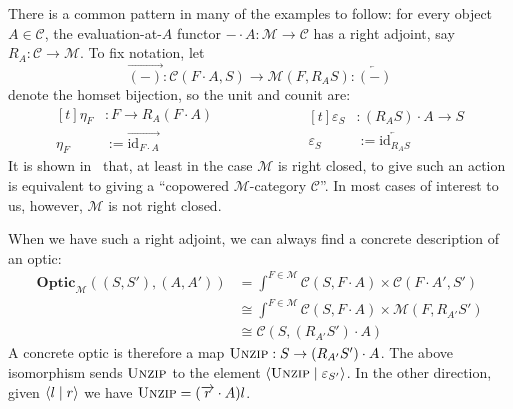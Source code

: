 \documentclass[11pt,letterpaper]{article}
\theoremstyle{plain}
\theoremstyle{definition}
\newcommand{\C}{\mathscr{C}}
\newcommand{\M}{\mathscr{M}}
\newcommand{\Optic}{\mathbf{Optic}}
\newcommand{\id}{\mathrm{id}}
\newcommand{\act}{\cdot}
\newcommand{\rep}[2]{{\ensuremath \left\langle #1 \mid #2 \right\rangle}}
\newcommand{\funzip}{\textsc{Unzip}}
\newcommand{\todo}[1]{\textcolor{red}{\small #1}}
\begin{document}
There is a common pattern in many of the examples to follow: for every object $A \in \C$, the evaluation-at-$A$ functor $- \act A : \M \to \C$ has a right adjoint, say $R_A : \C \to \M$. To fix notation, let \[\overrightarrow{(-)} : \C(F \act A, S) \to \M(F, R_{A} S) : \overleftarrow{(-)}\] denote the homset bijection, so the unit and counit are:
    \begin{equation*}
    \begin{aligned}[t]
  	\eta_F &: F \to R_A (F \act A) \\
    \eta_F &:= \overrightarrow{\id_{F \act A}}
    \end{aligned}
    \qquad\qquad\qquad
    \begin{aligned}[t]
    \varepsilon_{S} &: (R_A S) \cdot A \to S \\
    \varepsilon_{S} &:= \overleftarrow{\id_{R_{A} S}}
    \end{aligned}
\end{equation*}
It is shown in~\cite[Section 6]{ANoteOnActions} that, at least in the case $\M$ is right closed, to give such an action is equivalent to giving a ``copowered $\M$-category $\C$''. In most cases of interest to us, however, $\M$ is not right closed. %

When we have such a right adjoint, we can always find a concrete description of an optic:
\begin{align*}
\Optic_\M((S, S'), (A, A')) &= \int^{F \in \M} \C(S, F\act A) \times \C(F\act A', S') \\
&\cong \int^{F \in \M} \C(S, F \act A) \times \M(F, R_{A'} S') \\
&\cong \C(S,  (R_{A'} S') \act A)
\end{align*}
A concrete optic is therefore a map $\funzip : S \to (R_{A'} S') \act A$. The above isomorphism sends $\funzip$ to the element $\rep{\funzip}{\varepsilon_{S'}}$. In the other direction, given $\rep{l}{r}$ we have $\funzip = (\overrightarrow{r} \act A)l$.
\end{document}
